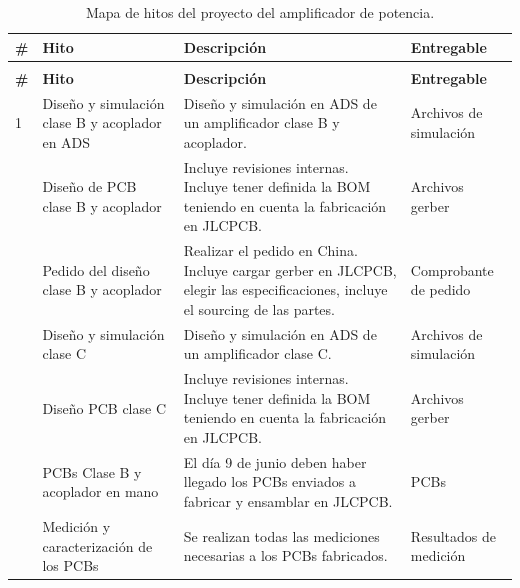 \begin{xltabular}{\textwidth}{>{\centering\arraybackslash}p{0.6cm} X X p{2.5cm}}
    \caption{Mapa de hitos del proyecto del amplificador de potencia.} \label{tab:mapa_hitos} \\
    \hline
    \textbf{\#} & \textbf{Hito} & \textbf{Descripción} & \textbf{Entregable} \\
    \hline
    \endfirsthead

     \\
    \hline
    \textbf{\#} & \textbf{Hito} & \textbf{Descripción} & \textbf{Entregable} \\
    \hline
    \endhead

    \hline
    \endfoot

    \hline
    \endlastfoot

    1 & Diseño y simulación clase B y acoplador en ADS & Diseño y simulación en ADS de un amplificador clase B y acoplador. & Archivos de simulación \\
    
     & Diseño de PCB clase B y acoplador & Incluye revisiones internas. Incluye tener definida la BOM teniendo en cuenta la fabricación en JLCPCB. & Archivos gerber \\
    
     & Pedido del diseño clase B y acoplador & Realizar el pedido en China. Incluye cargar gerber en JLCPCB, elegir las especificaciones, incluye el sourcing de las partes. & Comprobante de pedido \\
    
     & Diseño y simulación clase C & Diseño y simulación en ADS de un amplificador clase C. & Archivos de simulación \\
    
     & Diseño PCB clase C & Incluye revisiones internas. Incluye tener definida la BOM teniendo en cuenta la fabricación en JLCPCB. & Archivos gerber \\
    
     & PCBs Clase B y acoplador en mano & El día 9 de junio deben haber llegado los PCBs enviados a fabricar y ensamblar en JLCPCB. & PCBs \\
    
     & Medición y caracterización de los PCBs & Se realizan todas las mediciones necesarias a los PCBs fabricados. & Resultados de medición \\
    

\end{xltabular}
